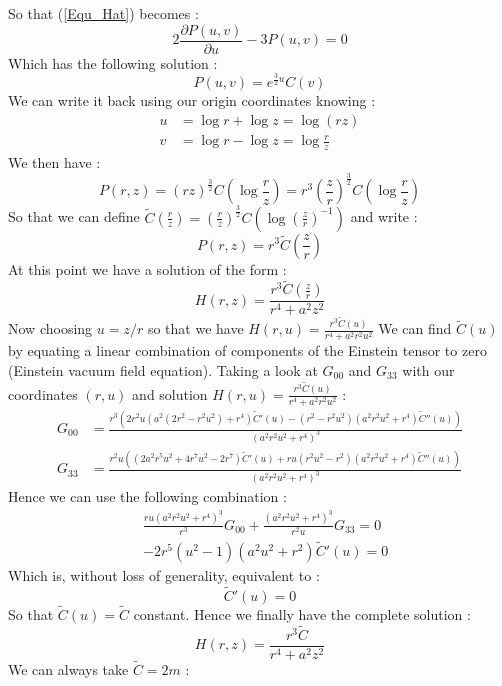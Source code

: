 \documentclass[a4paper,12pt]{article}
\theoremstyle{definition}
\begin{document}
So that (\ref{Equ_Hat}) becomes :
\begin{equation}
	2\frac{\partial P(u,v)}{\partial u}-3P(u,v)=0
\end{equation}
Which has the following solution :
\begin{equation}
	P(u,v)=e^{\frac{3}{2}u}C(v)
\end{equation}
We can write it back using our origin coordinates knowing :
\begin{equation}
\begin{split}
	u&=\log{r} + \log{z}=\log{(rz)}\\
	v&=\log{r} - \log{z}=\log{\frac{r}{z}}
\end{split}
\end{equation}
We then have :
\begin{equation}
	P(r,z)=(rz)^\frac{3}{2}C(\log{\frac{r}{z}})=r^3(\frac{z}{r})^\frac{3}{2}C(\log{\frac{r}{z}})
\end{equation}
So that we can define $\tilde C(\frac{r}{z})=(\frac{r}{z})^\frac{3}{2}C(\log{(\frac{z}{r})^{-1}})$ and write :
\begin{equation}
	P(r,z)=r^3\tilde C(\frac{z}{r})
\end{equation}
At this point we have a solution of the form :
\begin{equation}
	H(r,z)=\frac{r^3\tilde C(\frac{z}{r})}{r^4+a^2z^2}
\end{equation}
Now choosing $u=z/r$ so that we have $H(r,u)=\frac{r^3\tilde C(u)}{r^4+a^2r^2u^2}$
We can find $\tilde C(u)$ by equating a linear combination of components of the Einstein tensor to zero (Einstein vacuum field equation).
Taking a look at $G_{00}$ and $G_{33}$ with our coordinates $(r,u)$ and solution $H(r,u)=\frac{r^3\tilde C(u)}{r^4+a^2r^2u^2}$ :
\begin{equation}
\begin{split}
	G_{00}&=\frac{r^3 (2 r^2 u (a^2 (2 r^2-r^2
	u^2)+r^4) \tilde C'(u)-(r^2-r^2
	u^2) (a^2 r^2 u^2+r^4)
	\tilde C''(u))}{(a^2 r^2
	u^2+r^4)^3}\\
	G_{33}&=\frac{r^2 u ((2 a^2 r^5
   u^2+4 r^7 u^2-2 r^7)\tilde C'(u)+r u (r^2 u^2-r^2) (a^2
   r^2 u^2+r^4) \tilde C''(u)
   )}{(a^2 r^2 u^2+r^4)^3}
\end{split}
\end{equation}
Hence we can use the following combination :
\begin{equation}
\begin{split}
	&\frac{ru(a^2 r^2 u^2+r^4)^3}{r^3}G_{00}+\frac{(a^2 r^2 u^2+r^4)^3}{r^2u}G_{33}=0\\
	&-2 r^5 (u^2-1) (a^2 u^2+r^2)\tilde C'(u)=0
\end{split}
\end{equation}
Which is, without loss of generality, equivalent to :
\begin{equation}
	\tilde C'(u)=0
\end{equation}
So that $\tilde C(u)=\tilde C$ constant. Hence we finally have the complete solution :
\begin{equation}
	H(r,z)=\frac{r^3\tilde C}{r^4+a^2z^2}
\end{equation}
We can always take $\tilde C=2m$ :
\end{document}
